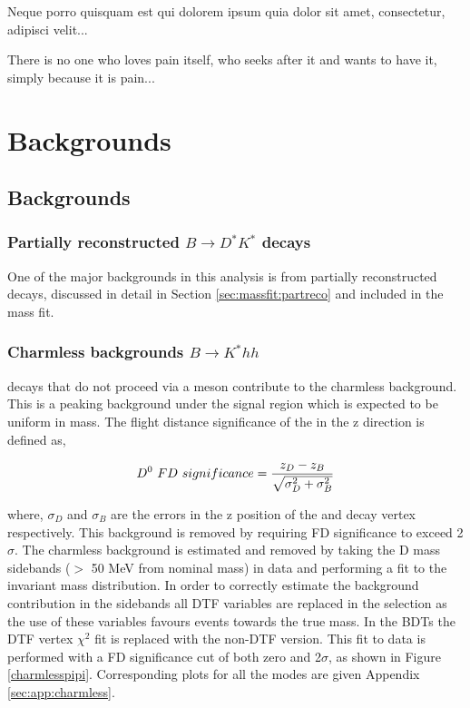 \clearpage
\begin{savequote}[8cm]
\textlatin{Neque porro quisquam est qui dolorem ipsum quia dolor sit amet, consectetur, adipisci velit...}

There is no one who loves pain itself, who seeks after it and wants to have it, simply because it is pain...
\end{savequote}

\chapter{\label{ch:6-backgrounds}Backgrounds} 

\minitoc

\section{Backgrounds}
\label{sec:backgrounds}

\subsection{Partially reconstructed $B \to D^*K^*$ decays}
\label{sec:backgrounds:partreco}

One of the major backgrounds in this analysis is from partially reconstructed \decay{\B}{\Dstar\Kstar} decays, discussed in detail in Section \ref{sec:massfit:partreco} and included in the mass fit.

\subsection{Charmless backgrounds $B \to K^*hh$}
\label{sec:backgrounds:charmless}

\B decays that do not proceed via a \D meson contribute to the charmless background. This is a peaking background under the signal region which is expected to be uniform in \D mass. The flight distance significance of the \Dz in the z direction is defined as,

\begin{equation}
{\ensuremath{{D}^0}}\ FD\ significance = \frac{z_D - z_B}{\sqrt{\sigma_D^2 + \sigma_B^2}}
\label{FDdefinition}
\end{equation}

where, $\sigma_D$ and $\sigma_B$ are the errors in the z position of the \D and \B decay vertex respectively. This background is removed by requiring \Dz FD significance to exceed 2$\sigma$. The charmless background is estimated and removed by taking the D mass sidebands ($>$ 50 MeV from nominal \D mass) in data and performing a fit to the invariant \B mass distribution. In order to correctly estimate the background contribution in the \D sidebands all DTF variables are replaced in the selection as the use of these variables favours events towards the true \D mass. In the BDTs the DTF vertex $\chi^2$ fit is replaced with the non-DTF version. This fit to data is performed with a FD significance cut of both zero and 2$\sigma$, as shown in Figure \ref{charmlesspipi}. Corresponding plots for all the modes are given Appendix \ref{sec:app:charmless}.

